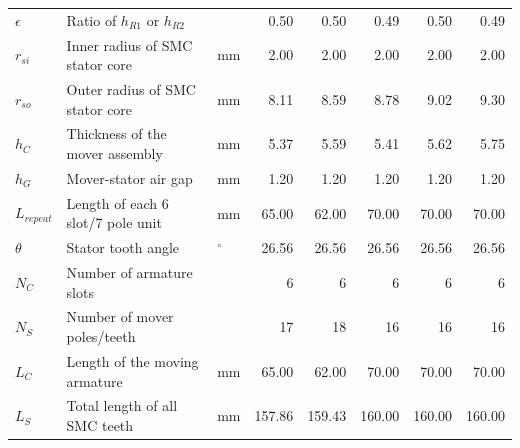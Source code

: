 \begin{landscape}
\begin{table}
\begin{tabular}{lllrrrrr}
                        $\epsilon$           & Ratio of $h_{R1}$ or $h_{R2}$             &                & 0.50           & 0.50           & 0.49           & 0.50           & 0.49           \\
                        $r_{si}$             & Inner radius of SMC stator core           & $\mathrm{mm}$  & 2.00           & 2.00           & 2.00           & 2.00           & 2.00           \\
                        $r_{so}$             & Outer radius of SMC stator core           & $\mathrm{mm}$  & 8.11           & 8.59           & 8.78           & 9.02           & 9.30           \\
                        $h_C$                & Thickness of the mover assembly           & $\mathrm{mm}$  & 5.37           & 5.59           & 5.41           & 5.62           & 5.75           \\
                        $h_G$                & Mover-stator air gap                      & $\mathrm{mm}$  & 1.20           & 1.20           & 1.20           & 1.20           & 1.20           \\
                        $L_{repeat}$         & Length of each 6 slot/7 pole unit         & $\mathrm{mm}$  & 65.00          & 62.00          & 70.00          & 70.00          & 70.00          \\
                        $\theta$             & Stator tooth angle                        & $\mathrm{^\circ}$   & 26.56           & 26.56         & 26.56          & 26.56          & 26.56  \\
                        \hline
                        $N_C$                & Number of armature slots                  &                & 6              & 6              & 6              & 6              & 6              \\
                        $N_S$                & Number of mover poles/teeth                      &                & 17             & 18             & 16             & 16             & 16             \\
                        $L_C$                & Length of the moving armature             & $\mathrm{mm}$  & 65.00          & 62.00          & 70.00          & 70.00          & 70.00          \\
                        $L_S$                & Total length of all SMC teeth             & $\mathrm{mm}$  & 157.86         & 159.43         & 160.00         & 160.00         & 160.00         \\

\end{tabular}
\end{table}
\end{landscape}
